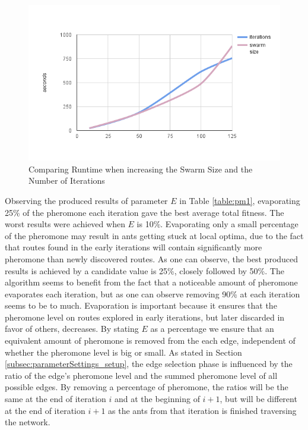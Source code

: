 \begin{figure}[H]
\begin{center}
  \includegraphics[width=5in]{assets/iterations_swarmsize_runtime.png}
  \end{center}
  \caption{Comparing Runtime when increasing the Swarm Size and the Number of Iterations}
  \label{fig:svsiruntime} 
\end{figure}

Observing the produced results of parameter $E$ in Table \vref{table:pm1}, evaporating 25\% of the pheromone each iteration gave the best average total fitness. The worst results were achieved when $E$ is 10\%. Evaporating only a small percentage of the pheromone may result in ants getting stuck at local optima, due to the fact that routes found in the early iterations will contain significantly more pheromone than newly discovered routes. As one can observe, the best produced results is achieved by a candidate value is 25\%, closely followed by 50\%. The algorithm seems to benefit from the fact that a noticeable amount of pheromone evaporates each iteration, but as one can observe removing 90\% at each iteration seems to be to much. Evaporation is important because it ensures that the pheromone level on routes explored in early iterations, but later discarded in favor of others, decreases. By stating $E$ as a percentage we ensure that an equivalent amount of pheromone is removed from the each edge, independent of whether the pheromone level is big or small. As stated in Section \vref{subsec:parameterSettings_setup}, the edge selection phase is influenced by the ratio of the edge's pheromone level and the summed pheromone level of all possible edges. By removing a percentage of pheromone, the ratios will be the same at the end of iteration $i$ and at the beginning of $i+1$, but will be different at the end of iteration $i+1$ as the ants from that iteration is finished traversing the network. 
\newline

